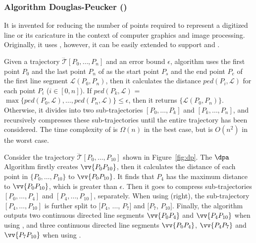 \subsubsection{Algorithm Douglas-Peucker  (\dpa) \cite{Douglas:Peucker}}
It is invented for reducing the number of points required to represent a digitized line or its caricature in the context of computer graphics and image processing.
{Originally, it uses \ped, however, it can be easily extended to support \sed and \dad.}


Given a trajectory $\dddot{\mathcal{T}}[P_0, \ldots, P_n]$ and an error bound $\epsilon$,  algorithm \dpa uses the first point $P_0$ and the last point $P_n$ of  as the start point $P_s$ and the end point $P_e$ of the first line segment $\mathcal{L}(P_0, P_n)$, then it calculates the distance $ped(P_i, {\mathcal{L}})$ for each point $P_i$ ($i\in[0,n]$). If $ped(P_k, {\mathcal{L}})$ = $\max \{ped(P_0, {\mathcal{L}}), \ldots, ped(P_n, {\mathcal{L}}) \} \le \epsilon$, then it returns $\{\mathcal{L}(P_0,P_n)\}$. Otherwise, it divides  into two sub-trajectories $[P_0, \ldots, P_k]$ and $[P_{k}, \ldots, P_n]$, and recursively compresses these sub-trajectories until the entire trajectory has been considered.
%
The time complexity of \dpa is $\Omega(n)$ in the best case, but is $O(n^2)$ in the worst case.




\begin{example}
	\label{exm-alg-lsa}
	Consider the trajectory $\dddot{\mathcal{T}}[P_0,\ldots,P_{10}]$ shown in Figure~\ref{fig:dp}.
	The $\dpa$ Algorithm firstly creates $\vv{P_0P_{10}}$, then it calculates the distance of each point in $\{P_0,\ldots,P_{10}\}$ to $\vv{P_0P_{10}}$.
	It finds that $P_{4}$ has the maximum distance to $\vv{P_0P_{10}}$, which is greater than $\epsilon$. Then it goes to compress sub-trajectories $[P_0, \ldots, P_{4}]$ and $[P_{4}, \ldots, P_{10}]$, separately.
	When using \sed (right), the sub-trajectory $[P_4,\ldots, P_{10}]$ is further split to $[P_4$, $\ldots$, $P_7]$ and $[P_7$, $P_{10}]$.
	Finally, the algorithm outputs two continuous directed line segments $\vv{P_0P_4}$ and $\vv{P_4P_{10}}$ when using \ped, and three continuous directed line segments $\vv{P_0P_4}$, $\vv{P_4P_7}$ and $\vv{P_7P_{10}}$ when using \sed.
\end{example}




